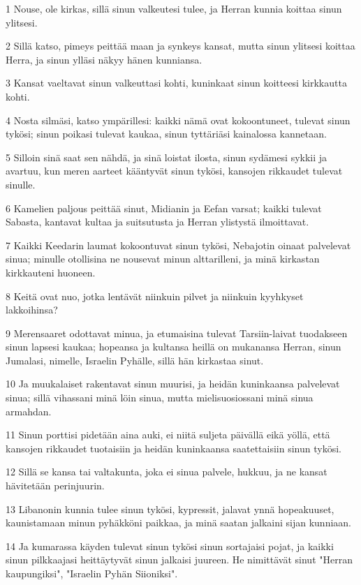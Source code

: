 \par 1 Nouse, ole kirkas, sillä sinun valkeutesi tulee, ja Herran kunnia koittaa sinun ylitsesi.
\par 2 Sillä katso, pimeys peittää maan ja synkeys kansat, mutta sinun ylitsesi koittaa Herra, ja sinun ylläsi näkyy hänen kunniansa.
\par 3 Kansat vaeltavat sinun valkeuttasi kohti, kuninkaat sinun koitteesi kirkkautta kohti.
\par 4 Nosta silmäsi, katso ympärillesi: kaikki nämä ovat kokoontuneet, tulevat sinun tykösi; sinun poikasi tulevat kaukaa, sinun tyttäriäsi kainalossa kannetaan.
\par 5 Silloin sinä saat sen nähdä, ja sinä loistat ilosta, sinun sydämesi sykkii ja avartuu, kun meren aarteet kääntyvät sinun tykösi, kansojen rikkaudet tulevat sinulle.
\par 6 Kamelien paljous peittää sinut, Midianin ja Eefan varsat; kaikki tulevat Sabasta, kantavat kultaa ja suitsutusta ja Herran ylistystä ilmoittavat.
\par 7 Kaikki Keedarin laumat kokoontuvat sinun tykösi, Nebajotin oinaat palvelevat sinua; minulle otollisina ne nousevat minun alttarilleni, ja minä kirkastan kirkkauteni huoneen.
\par 8 Keitä ovat nuo, jotka lentävät niinkuin pilvet ja niinkuin kyyhkyset lakkoihinsa?
\par 9 Merensaaret odottavat minua, ja etumaisina tulevat Tarsiin-laivat tuodakseen sinun lapsesi kaukaa; hopeansa ja kultansa heillä on mukanansa Herran, sinun Jumalasi, nimelle, Israelin Pyhälle, sillä hän kirkastaa sinut.
\par 10 Ja muukalaiset rakentavat sinun muurisi, ja heidän kuninkaansa palvelevat sinua; sillä vihassani minä löin sinua, mutta mielisuosiossani minä sinua armahdan.
\par 11 Sinun porttisi pidetään aina auki, ei niitä suljeta päivällä eikä yöllä, että kansojen rikkaudet tuotaisiin ja heidän kuninkaansa saatettaisiin sinun tykösi.
\par 12 Sillä se kansa tai valtakunta, joka ei sinua palvele, hukkuu, ja ne kansat hävitetään perinjuurin.
\par 13 Libanonin kunnia tulee sinun tykösi, kypressit, jalavat ynnä hopeakuuset, kaunistamaan minun pyhäkköni paikkaa, ja minä saatan jalkaini sijan kunniaan.
\par 14 Ja kumarassa käyden tulevat sinun tykösi sinun sortajaisi pojat, ja kaikki sinun pilkkaajasi heittäytyvät sinun jalkaisi juureen. He nimittävät sinut "Herran kaupungiksi", "Israelin Pyhän Siioniksi".
